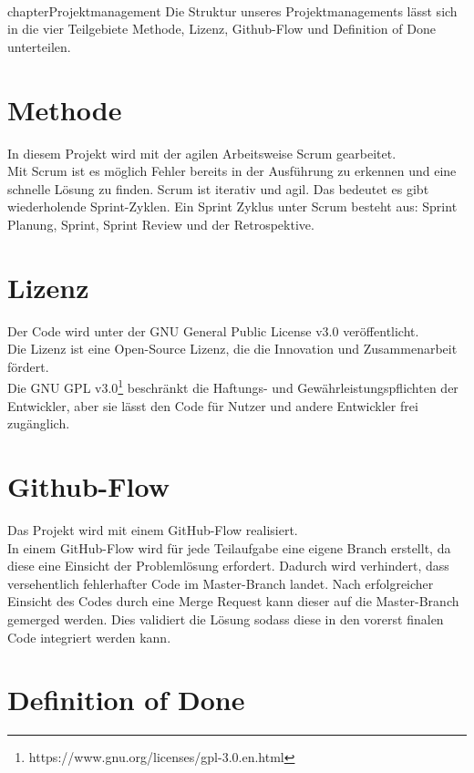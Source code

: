 \\chapter{Projektmanagement}\label{ch:projektmanagement}
Die Struktur unseres Projektmanagements lässt sich in die vier Teilgebiete Methode, Lizenz, Github-Flow
und Definition of Done unterteilen.
\section{Methode}\label{sec:methode}

In diesem Projekt wird mit der agilen Arbeitsweise Scrum gearbeitet.\\
Mit Scrum ist es möglich Fehler bereits in der Ausführung zu erkennen und eine schnelle Lösung zu finden.
Scrum ist iterativ und agil. Das bedeutet es gibt wiederholende Sprint-Zyklen.
Ein Sprint Zyklus unter Scrum besteht aus: Sprint Planung, Sprint, Sprint Review und der Retrospektive.

\section{Lizenz}\label{sec:lizenz}

Der Code wird unter der GNU General Public License v3.0 veröffentlicht.\\
Die Lizenz ist eine Open-Source Lizenz, die die Innovation und Zusammenarbeit fördert.\\
Die GNU GPL v3.0\footnote{https://www.gnu.org/licenses/gpl-3.0.en.html} beschränkt die Haftungs- und Gewährleistungspflichten der Entwickler, aber sie lässt den Code für Nutzer und andere Entwickler frei zugänglich.

\section{Github-Flow}\label{sec:github-flow}

Das Projekt wird mit einem GitHub-Flow realisiert.\\
In einem GitHub-Flow wird für jede Teilaufgabe eine eigene Branch erstellt, da diese eine Einsicht der Problemlösung erfordert.
Dadurch wird verhindert, dass versehentlich fehlerhafter Code im Master-Branch landet.
Nach erfolgreicher Einsicht des Codes durch eine Merge Request kann dieser auf die Master-Branch gemerged werden. Dies validiert die Lösung sodass diese in den vorerst finalen Code integriert werden kann.

\section{Definition of Done}\label{sec:dod}

